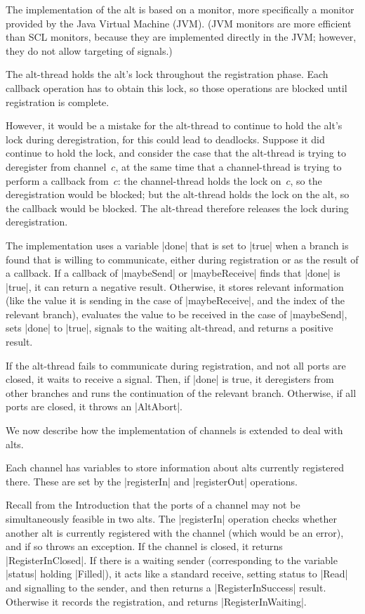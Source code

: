The implementation of the alt is based on a monitor, more specifically a
monitor provided by the Java Virtual Machine (JVM).  (JVM monitors are more
efficient than SCL monitors, because they are implemented directly in the JVM;
however, they do not allow targeting of signals.)  

The alt-thread holds the alt's lock throughout the registration phase.  Each
callback operation has to obtain this lock, so those operations are blocked
until registration is complete. 

However, it would be a mistake for the alt-thread to continue to hold the
alt's lock during deregistration, for this could lead to deadlocks.  Suppose
it did continue to hold the lock, and consider the case that the alt-thread is
trying to deregister from channel~$c$, at the same time that a channel-thread
is trying to perform a callback from~$c$: the channel-thread holds the lock
on~$c$, so the deregistration would be blocked; but the alt-thread holds the
lock on the alt, so the callback would be blocked.  The alt-thread therefore
releases the lock during deregistration. 

The implementation uses a variable |done| that is set to |true| when a
branch is found that is willing to communicate, either during registration or
as the result of a callback.  If a callback of |maybeSend| or |maybeReceive|
finds that |done| is |true|, it can return a negative result.  Otherwise, it
stores relevant information (like the value it is sending in the case of
|maybeReceive|, and the index of the relevant branch), evaluates the value to
be received in the case of |maybeSend|, sets |done| to |true|, signals to the
waiting alt-thread, and returns a positive result.

If the alt-thread fails to communicate during registration, and not all
ports are closed, it waits to receive a signal.  Then, if |done| is true, it
deregisters from other branches and runs the continuation of the relevant
branch.  Otherwise, if all ports are closed, it throws an |AltAbort|. 


We now describe how the implementation of channels is extended to deal with
alts.

Each channel has variables to store information about alts currently
registered there.  These are set by the |registerIn| and |registerOut|
operations. 

Recall from the Introduction that the ports of a channel may not be
simultaneously feasible in two alts.
The |registerIn| operation checks whether another alt is currently registered
with the channel (which would be an error), and if so throws an exception.  If
the channel is closed, it returns |RegisterInClosed|.  If there is a waiting
sender (corresponding to the variable |status| holding |Filled|), it acts like
a standard receive, setting status to |Read| and signalling to the sender, and
then returns a |RegisterInSuccess| result.  Otherwise it records the
registration, and returns |RegisterInWaiting|.

